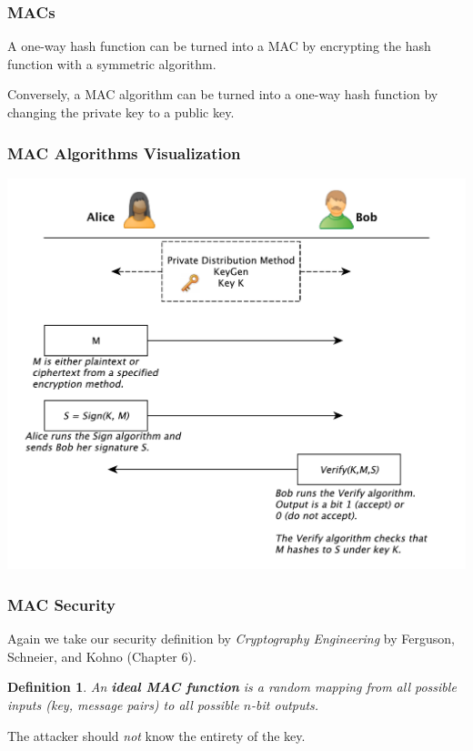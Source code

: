 \documentclass{beamer}
\newtheorem{defn}{Definition}[section]
\newcommand{\<}{\langle}
\renewcommand{\>}{\rangle}
\begin{document}
\begin{frame}
\frametitle{MACs}

A one-way hash function can be turned into a MAC by encrypting the hash function with a symmetric algorithm. \newline

Conversely, a MAC algorithm can be turned into a one-way hash function by changing the private key to a public key. 
\end{frame}


\begin{frame}
\frametitle{MAC Algorithms Visualization}

\includegraphics[scale=.45]{IMG/MACalg}
\end{frame}



\begin{frame}
\frametitle{MAC Security}

Again we take our security definition by \emph{Cryptography Engineering} by Ferguson, Schneier, and Kohno (Chapter 6).\newline

\begin{defn}
An \textbf{ideal MAC function} is a random mapping from all possible inputs (key, message pairs) to all possible $n$-bit outputs. 
\end{defn}

The attacker should \emph{not} know the entirety of the key. 
\end{frame}
\end{document}

